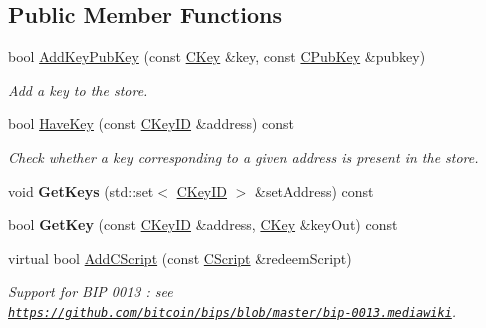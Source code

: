 \subsection*{Public Member Functions}
\begin{DoxyCompactItemize}
\item 
\mbox{\label{class_c_basic_key_store_acc2e33f319de88e88f86b0dc79bdcb65}} 
bool \mbox{\hyperlink{class_c_basic_key_store_acc2e33f319de88e88f86b0dc79bdcb65}{Add\+Key\+Pub\+Key}} (const \mbox{\hyperlink{class_c_key}{C\+Key}} \&key, const \mbox{\hyperlink{class_c_pub_key}{C\+Pub\+Key}} \&pubkey)
\begin{DoxyCompactList}\small\item\em Add a key to the store. \end{DoxyCompactList}\item 
\mbox{\label{class_c_basic_key_store_afc99762e3e58f93e198d85ecfdf5804a}} 
bool \mbox{\hyperlink{class_c_basic_key_store_afc99762e3e58f93e198d85ecfdf5804a}{Have\+Key}} (const \mbox{\hyperlink{class_c_key_i_d}{C\+Key\+ID}} \&address) const
\begin{DoxyCompactList}\small\item\em Check whether a key corresponding to a given address is present in the store. \end{DoxyCompactList}\item 
\mbox{\label{class_c_basic_key_store_a41f3895021dae008582ceb55a98b0891}} 
void {\bfseries Get\+Keys} (std\+::set$<$ \mbox{\hyperlink{class_c_key_i_d}{C\+Key\+ID}} $>$ \&set\+Address) const
\item 
\mbox{\label{class_c_basic_key_store_a69328ee642e4234922356f59876e956d}} 
bool {\bfseries Get\+Key} (const \mbox{\hyperlink{class_c_key_i_d}{C\+Key\+ID}} \&address, \mbox{\hyperlink{class_c_key}{C\+Key}} \&key\+Out) const
\item 
\mbox{\label{class_c_basic_key_store_a56249ce3540398999cd397eeb662e836}} 
virtual bool \mbox{\hyperlink{class_c_basic_key_store_a56249ce3540398999cd397eeb662e836}{Add\+C\+Script}} (const \mbox{\hyperlink{class_c_script}{C\+Script}} \&redeem\+Script)
\begin{DoxyCompactList}\small\item\em Support for B\+IP 0013 \+: see \href{https://github.com/bitcoin/bips/blob/master/bip-0013.mediawiki}{\tt https\+://github.\+com/bitcoin/bips/blob/master/bip-\/0013.\+mediawiki}. \end{DoxyCompactList}\item 

\end{DoxyCompactItemize}
